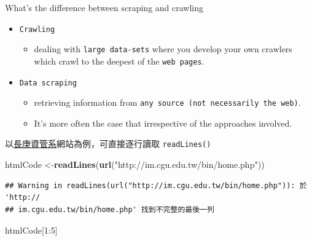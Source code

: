 \documentclass[]{book}
\newenvironment{Shaded}{\begin{snugshade}}{\end{snugshade}}
\newcommand{\KeywordTok}[1]{\textcolor[rgb]{0.13,0.29,0.53}{\textbf{{#1}}}}
\newcommand{\DecValTok}[1]{\textcolor[rgb]{0.00,0.00,0.81}{{#1}}}
\newcommand{\StringTok}[1]{\textcolor[rgb]{0.31,0.60,0.02}{{#1}}}
\newcommand{\NormalTok}[1]{{#1}}
\providecommand{\tightlist}{%
  \setlength{\itemsep}{0pt}\setlength{\parskip}{0pt}}
\theoremstyle{definition}
\theoremstyle{definition}
\theoremstyle{remark}
\begin{document}
What's the difference between scraping and crawling

\begin{itemize}
\tightlist
\item
  \texttt{Crawling}

  \begin{itemize}
  \tightlist
  \item
    dealing with \texttt{large\ data-sets} where you develop your own
    crawlers which crawl to the deepest of the \texttt{web\ pages}.
  \end{itemize}
\item
  \texttt{Data\ scraping}

  \begin{itemize}
  \tightlist
  \item
    retrieving information from
    \texttt{any\ source\ (not\ necessarily\ the\ web)}.
  \item
    It's more often the case that irrespective of the approaches
    involved.
  \end{itemize}
\end{itemize}

以\href{http://im.cgu.edu.tw/bin/home.php}{長庚資管系}網站為例，可直接逐行讀取
\texttt{readLines()}

\begin{Shaded}
\begin{Highlighting}[]
\NormalTok{htmlCode <-}\KeywordTok{readLines}\NormalTok{(}\KeywordTok{url}\NormalTok{(}\StringTok{"http://im.cgu.edu.tw/bin/home.php"}\NormalTok{))}
\end{Highlighting}
\end{Shaded}

\begin{verbatim}
## Warning in readLines(url("http://im.cgu.edu.tw/bin/home.php")): 於 'http://
## im.cgu.edu.tw/bin/home.php' 找到不完整的最後一列
\end{verbatim}

\begin{Shaded}
\begin{Highlighting}[]
\NormalTok{htmlCode[}\DecValTok{1}\NormalTok{:}\DecValTok{5}\NormalTok{]}
\end{Highlighting}
\end{Shaded}
\end{document}

